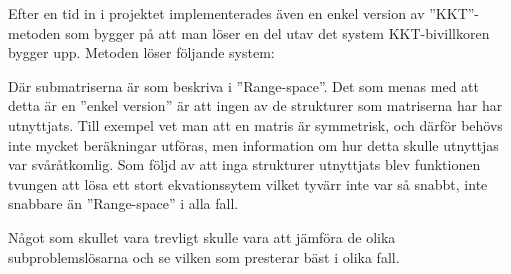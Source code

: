 Efter en tid in i projektet implementerades även en enkel version av ''KKT''-metoden som bygger på att man löser en del utav det system KKT-bivillkoren bygger upp. Metoden löser följande system:


Där submatriserna är som beskriva i ''Range-space''. Det som menas med att detta är en ''enkel version'' är att ingen av de strukturer som matriserna har har utnyttjats. Till exempel vet man att en matris är symmetrisk, och därför behövs inte mycket beräkningar utföras, men information om hur detta skulle utnyttjas var svåråtkomlig. Som följd av att inga strukturer utnyttjats blev funktionen tvungen att lösa ett stort ekvationssytem vilket tyvärr inte var så snabbt, inte snabbare än ''Range-space'' i alla fall.


Något som skullet vara trevligt skulle vara att jämföra de olika subproblemslösarna och se vilken som presterar bäst i olika fall.





